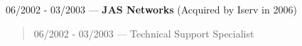06/2002 - 03/2003 --- {\bf JAS Networks} (Acquired by Iserv in 2006)
\begin{quote}
06/2002 - 03/2003 --- Technical Support Specialist\\
\end{quote}
